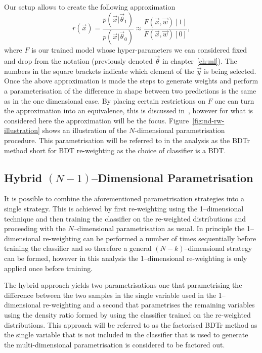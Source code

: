 Our setup allows to create the following approximation
\begin{equation}
  r(\vec{x}) =  \frac{p(\vec{x}|\vec{\theta}_{1})}{p(\vec{x}|\vec{\theta}_{0})}
  \approx \frac{F(\vec{x}, \vec{w})[1]}{F(\vec{x}, \vec{w})[0]},
  \label{eq:bdtr-approximation}
\end{equation}
where $F$ is our trained model whose hyper-parameters we can considered fixed
and drop from the notation (previously denoted $\vec{\theta}$ in
chapter~\ref{ch:ml}). The numbers in the square brackets indicate which element
of the $\vec{y}$ is being selected. Once the above approximation is made the
steps to generate weights and perform a parameterisation of the difference in
shape between two predictions is the same as in the one dimensional case. By
placing certain restrictions on $F$ one can turn the approximation into an
equivalence, this is discussed in~\cite{VHModellingNote2019}, however for what
is considered here the approximation will be the focus.
Figure~\ref{fig:nd-rw-illustration} shows an illustration of the $N$-dimensional
parametrisation procedure. This parametrisation will be referred to in the
analysis as the BDTr method short for BDT re-weighting as the choice of
classifier is a BDT.

\subsection{Hybrid $(N - 1)$--Dimensional Parametrisation}
\label{sec:hybrid-reweight}

It is possible to combine the aforementioned parametrisation strategies into a
single strategy. This is achieved by first re-weighting using the 1--dimensional
technique and then training the classifier on the re-weighted distributions and
proceeding with the $N$--dimensional parametrisation as usual. In principle the
1--dimensional re-weighting can be performed a number of times sequentially
before training the classifier and so therefore a general $(N-k)$--dimensional
strategy can be formed, however in this analysis the 1--dimensional re-weighting
is only applied once before training.

The hybrid approach yields two parametrisations one that parametrising the
difference between the two samples in the single variable used in the
1--dimensional re-weighting and a second that parametrises the remaining
variables using the density ratio formed by using the classifier trained on the
re-weighted distributions. This approach will be referred to as the factorised
BDTr method as the single variable that is not included in the classifier that
is used to generate the multi-dimensional parametrisation is considered to be
factored out.

